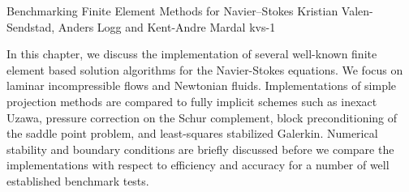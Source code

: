               {Benchmarking Finite Element Methods for Navier--Stokes}
              {Kristian Valen-Sendstad, Anders Logg and Kent-Andre Mardal}
              {kvs-1}

In this chapter, we discuss the implementation of several well-known
finite element based solution algorithms for the Navier-Stokes
equations. We focus on laminar incompressible flows and Newtonian
fluids. Implementations of simple projection methods are compared to
fully implicit schemes such as inexact Uzawa, pressure correction on
the Schur complement, block preconditioning of the saddle point
problem, and least-squares stabilized Galerkin. Numerical stability
and boundary conditions are briefly discussed before we compare the
implementations with respect to efficiency and accuracy for a number
of well established benchmark tests.
